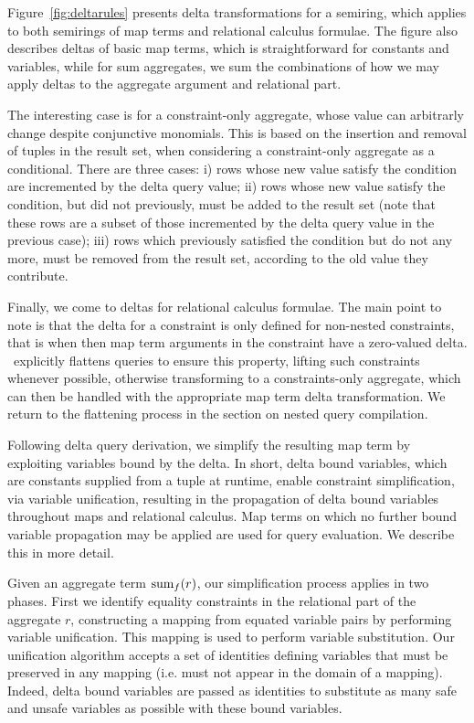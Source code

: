 Figure~\ref{fig:deltarules} presents delta transformations for a semiring, which
applies to both semirings of map terms and relational calculus formulae. The
figure also describes deltas of basic map terms, which is straightforward for
constants and variables, while for sum aggregates, we sum the combinations of
how we may apply deltas to the aggregate argument and relational part.

The interesting case is for a constraint-only aggregate, whose value can
arbitrarly change despite conjunctive monomials. This is based on the insertion
and removal of tuples in the result set, when considering a constraint-only
aggregate as a conditional. There are three cases:
i) rows whose new value satisfy the condition are
  incremented by the delta query value;
ii) rows whose new value satisfy the condition, but did not previously, must
  be added to the result set (note that these rows are a subset of those
  incremented by the delta query value in the previous case);
iii) rows which previously satisfied the condition but do not any more, must be
  removed from the result set, according to the old value they contribute.

Finally, we come to deltas for relational calculus formulae. The main point to
note is that the delta for a constraint is only defined for non-nested
constraints, that is when then map term arguments in the constraint have a
zero-valued delta. \compiler\ explicitly flattens queries to ensure this
property, lifting such constraints whenever possible, otherwise transforming to
a constraints-only aggregate, which can then be handled with the appropriate map
term delta transformation. We return to the flattening process in the section on
nested query compilation.


Following delta query derivation, we simplify the resulting map term by
exploiting variables bound by the delta. In short, delta bound variables, which
are constants supplied from a tuple at runtime, enable constraint
simplification, via variable unification, resulting in the propagation of delta
bound variables throughout maps and relational calculus. Map terms on which no
further bound variable propagation may be applied are used for query
evaluation. We describe this in more detail.

Given an aggregate term $\mathrm{sum}_{f}(r)$, our simplification process applies in
two phases. First we identify equality constraints in the relational part of the
aggregate $r$, constructing a mapping from equated variable pairs by performing
variable unification. This mapping is used to perform variable substitution. Our
unification algorithm accepts a set of identities defining variables that must
be preserved in any mapping (i.e. must not appear in the domain of a
mapping). Indeed, delta bound variables are passed as identities to substitute
as many safe and unsafe variables as possible with these bound
variables.

